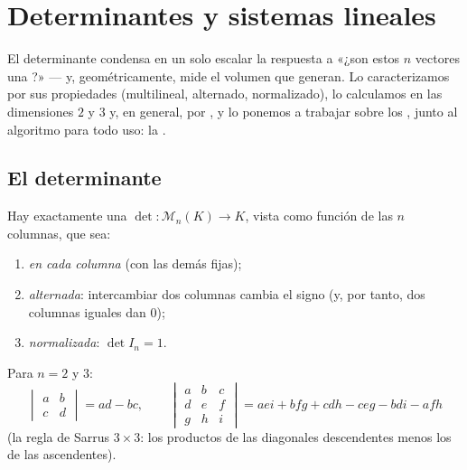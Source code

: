 \chapter{Determinantes y sistemas lineales}\label{ch:b1:det}

El determinante condensa en un solo escalar la respuesta a «¿son
estos $n$ vectores una ?» --- y, geométricamente, mide el
volumen que generan. Lo caracterizamos por sus propiedades
(multilineal, alternado, normalizado), lo calculamos en las
dimensiones $2$ y $3$ y, en general, por ,
y lo ponemos a trabajar sobre los , junto al
algoritmo para todo uso: la .

\section{El determinante}

\begin{theorem}[Caracterización]\label{thm:b1:det:def}
Hay exactamente una  $\det \colon \mathcal{M}_n(K) \to K$,
vista como función de las $n$ columnas, que sea:
\begin{enumerate}
  \item \emph{ en cada columna} (con las demás fijas);
  \item \emph{alternada}: intercambiar dos columnas cambia el signo
        (y, por tanto, dos columnas iguales dan $0$);
  \item \emph{normalizada}: $\det I_n = 1$.
\end{enumerate}
Para $n = 2$ y $3$:
\[
\begin{vmatrix} a & b\\ c & d\end{vmatrix} = ad - bc,
\qquad
\begin{vmatrix} a & b & c\\ d & e & f\\ g & h & i\end{vmatrix}
= aei + bfg + cdh - ceg - bdi - afh
\]
(la regla de Sarrus $3 \times 3$: los productos de las diagonales
descendentes menos los de las ascendentes).
\end{theorem}
\admitted


